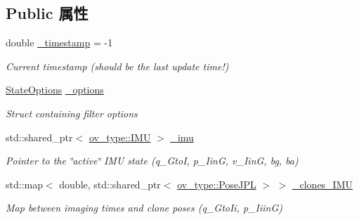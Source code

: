 \subsection*{Public 属性}
\begin{DoxyCompactItemize}
\item 
\mbox{\label{classov__msckf_1_1State_ae7615177e3edeb8eac39eb05867dc72f}} 
double \hyperlink{classov__msckf_1_1State_ae7615177e3edeb8eac39eb05867dc72f}{\+\_\+timestamp} = -\/1
\begin{DoxyCompactList}\small\item\em Current timestamp (should be the last update time!) \end{DoxyCompactList}\item 
\mbox{\label{classov__msckf_1_1State_a2af409a71537d305b45c62a91b6dda75}} 
\hyperlink{structov__msckf_1_1StateOptions}{State\+Options} \hyperlink{classov__msckf_1_1State_a2af409a71537d305b45c62a91b6dda75}{\+\_\+options}
\begin{DoxyCompactList}\small\item\em Struct containing filter options \end{DoxyCompactList}\item 
\mbox{\label{classov__msckf_1_1State_aeb5600395921fb8ac81f585006186a64}} 
std\+::shared\+\_\+ptr$<$ \hyperlink{classov__type_1_1IMU}{ov\+\_\+type\+::\+I\+MU} $>$ \hyperlink{classov__msckf_1_1State_aeb5600395921fb8ac81f585006186a64}{\+\_\+imu}
\begin{DoxyCompactList}\small\item\em Pointer to the \char`\"{}active\char`\"{} I\+MU state (q\+\_\+\+GtoI, p\+\_\+\+IinG, v\+\_\+\+IinG, bg, ba) \end{DoxyCompactList}\item 
\mbox{\label{classov__msckf_1_1State_a9fdd8bcc9f67c124257a8daa81bfb15d}} 
std\+::map$<$ double, std\+::shared\+\_\+ptr$<$ \hyperlink{classov__type_1_1PoseJPL}{ov\+\_\+type\+::\+Pose\+J\+PL} $>$ $>$ \hyperlink{classov__msckf_1_1State_a9fdd8bcc9f67c124257a8daa81bfb15d}{\+\_\+clones\+\_\+\+I\+MU}
\begin{DoxyCompactList}\small\item\em Map between imaging times and clone poses (q\+\_\+\+Gto\+Ii, p\+\_\+\+IiinG) \end{DoxyCompactList}\item 

\end{DoxyCompactItemize}
